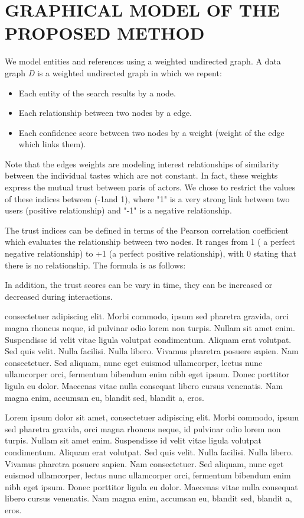 \chapter{GRAPHICAL MODEL OF THE PROPOSED METHOD}

We model entities and references using a weighted undirected graph. A data graph {\it D} is a weighted undirected graph in which we repent:
\begin{itemize}
	\item Each entity of the search results by a node.
	\item Each relationship between two nodes by a edge.
	\item Each confidence score between two nodes by a weight (weight of the edge which links them).
\end{itemize}
Note that the edges weights are modeling interest relationships of similarity between the individual tastes which are not constant. In fact, these weights express the mutual trust between paris of actors. We chose to restrict the values of these indices between (-1and 1), where "1" is a very strong link between two users (positive relationship) and "-1" is a negative relationship.

The trust indices can be defined in terms of the Pearson correlation coefficient {} which evaluates the relationship between two nodes. It ranges from 1 ( a perfect negative relationship) to +1 (a perfect positive relationship), with 0 stating that there is no relationship. The formula is as follows:

In addition, the trust scores can be vary in time, they can be increased or decreased during interactions.


 consectetuer adipiscing elit. Morbi commodo, ipsum sed pharetra gravida, orci magna rhoncus neque, id pulvinar odio lorem non turpis. Nullam sit amet enim. Suspendisse id velit vitae ligula volutpat condimentum. Aliquam erat volutpat. Sed quis velit. Nulla facilisi. Nulla libero. Vivamus pharetra posuere sapien. Nam consectetuer. Sed aliquam, nunc eget euismod ullamcorper, lectus nunc ullamcorper orci, fermentum bibendum enim nibh eget ipsum. Donec porttitor ligula eu dolor. Maecenas vitae nulla consequat libero cursus venenatis. Nam magna enim, accumsan eu, blandit sed, blandit a, eros.

Lorem ipsum dolor sit amet, consectetuer adipiscing elit. Morbi commodo, ipsum sed pharetra gravida, orci magna rhoncus neque, id pulvinar odio lorem non turpis. Nullam sit amet enim. Suspendisse id velit vitae ligula volutpat condimentum. Aliquam erat volutpat. Sed quis velit. Nulla facilisi. Nulla libero. Vivamus pharetra posuere sapien. Nam consectetuer. Sed aliquam, nunc eget euismod ullamcorper, lectus nunc ullamcorper orci, fermentum bibendum enim nibh eget ipsum. Donec porttitor ligula eu dolor. Maecenas vitae nulla consequat libero cursus venenatis. Nam magna enim, accumsan eu, blandit sed, blandit a, eros.


